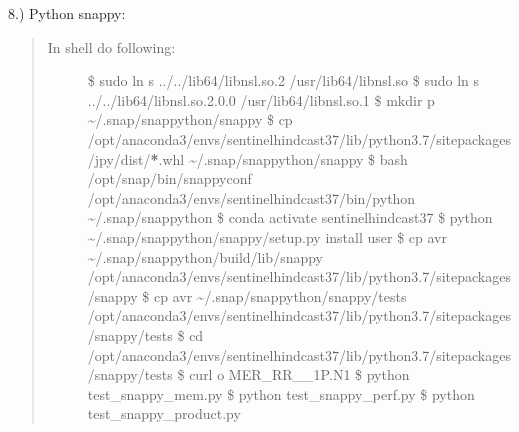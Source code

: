 \documentclass[letterpaper,10pt,english]{sphinxmanual}
\begin{document}
8.) Python \sphinxhyphen{} snappy: 
\begin{quote}
\begin{description}
\item[{In shell do following:}] \leavevmode
\$ sudo ln \sphinxhyphen{}s ../../lib64/libnsl.so.2 /usr/lib64/libnsl.so
\$ sudo ln \sphinxhyphen{}s ../../lib64/libnsl.so.2.0.0 /usr/lib64/libnsl.so.1
\$ mkdir \sphinxhyphen{}p \textasciitilde{}/.snap/snap\sphinxhyphen{}python/snappy
\$ cp /opt/anaconda3/envs/sentinel\sphinxhyphen{}hindcast\sphinxhyphen{}37/lib/python3.7/site\sphinxhyphen{}packages/jpy/dist/{\color{red}\bfseries{}*}.whl \textasciitilde{}/.snap/snap\sphinxhyphen{}python/snappy
\$ bash /opt/snap/bin/snappy\sphinxhyphen{}conf /opt/anaconda3/envs/sentinel\sphinxhyphen{}hindcast\sphinxhyphen{}37/bin/python \textasciitilde{}/.snap/snap\sphinxhyphen{}python
\$ conda activate sentinel\sphinxhyphen{}hindcast\sphinxhyphen{}37
\$ python \textasciitilde{}/.snap/snap\sphinxhyphen{}python/snappy/setup.py install \textendash{}user
\$ cp \sphinxhyphen{}avr \textasciitilde{}/.snap/snap\sphinxhyphen{}python/build/lib/snappy /opt/anaconda3/envs/sentinel\sphinxhyphen{}hindcast\sphinxhyphen{}37/lib/python3.7/site\sphinxhyphen{}packages/snappy
\$ cp \sphinxhyphen{}avr \textasciitilde{}/.snap/snap\sphinxhyphen{}python/snappy/tests /opt/anaconda3/envs/sentinel\sphinxhyphen{}hindcast\sphinxhyphen{}37/lib/python3.7/site\sphinxhyphen{}packages/snappy/tests
\$ cd /opt/anaconda3/envs/sentinel\sphinxhyphen{}hindcast\sphinxhyphen{}37/lib/python3.7/site\sphinxhyphen{}packages/snappy/tests
\$ curl  \sphinxhyphen{}o MER\_RR\_\_1P.N1
\$ python test\_snappy\_mem.py
\$ python test\_snappy\_perf.py
\$ python test\_snappy\_product.py

\end{description}
\end{quote}
\end{document}
